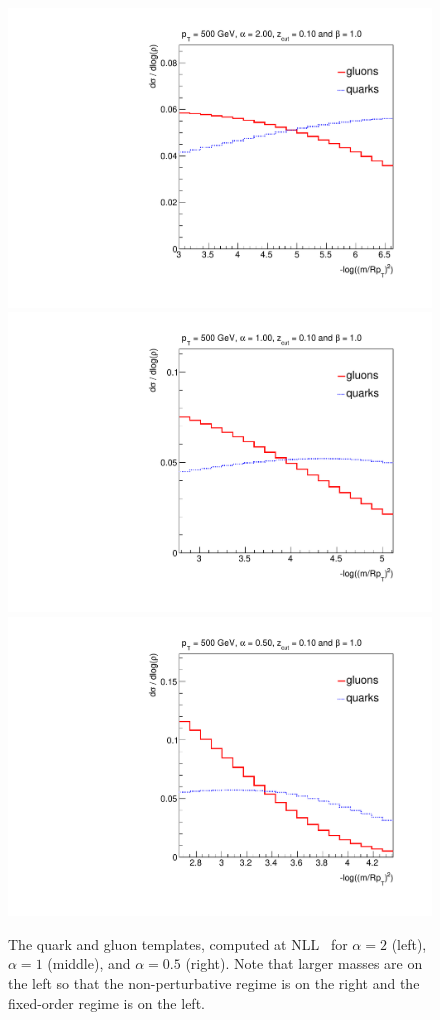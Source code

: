 \begin{figure}[h!]
\begin{center}
\includegraphics[width = 0.33\columnwidth]{figures/PDFs_alpha_2_00zcut0_10_beta_1_000.pdf}\includegraphics[width = 0.33\columnwidth]{figures/PDFs_alpha_1_00zcut0_10_beta_1_000.pdf}\includegraphics[width = 0.33\columnwidth]{figures/PDFs_alpha_0_50zcut0_10_beta_1_000.pdf}
\end{center}
\caption{The quark and gluon templates, computed at
  NLL~\cite{Marzani:2017mva,Marzani:2017kqd} for $\alpha=2$ (left),
  $\alpha=1$ (middle), and $\alpha=0.5$ (right).  Note that larger
  masses are on the left so that the non-perturbative regime is on the
  right and the fixed-order regime is on the left. }
\label{fig:templates}
\end{figure}
	
